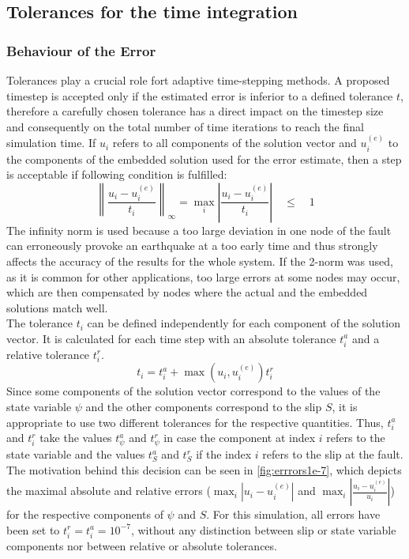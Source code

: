 \subsection{Tolerances for the time integration}
\subsubsection{Behaviour of the Error}
Tolerances play a crucial role fort adaptive time-stepping methods. A proposed timestep is accepted only if the estimated error is inferior to a defined tolerance $t$, therefore a carefully chosen tolerance has a direct impact on the timestep size and consequently on the total number of time iterations to reach the final simulation time. If $u_i$ refers to all components of the solution vector and $u_i^{(e)}$ to the components of the embedded solution used for the error estimate, then a step is acceptable if following condition is fulfilled: 
\begin{equation}
\left\|\frac{u_i - u_i^{(e)}}{t_i}\right\|_\infty = \max_i \left|\frac{u_i - u_i^{(e)}}{t_i}\right|
\quad \leq \quad 1
\end{equation}
The infinity norm is used because a too large deviation in one node of the fault can erroneously provoke an earthquake at a too early time and thus strongly affects the accuracy of the results for the whole system. If the 2-norm was used, as it is common for other applications, too large errors at some nodes may occur, which are then compensated by nodes where the actual and the embedded solutions match well. \\
The tolerance $t_i$ can be defined independently for each component of the solution vector. It is calculated for each time step with an absolute tolerance $t_i^a$ and a relative tolerance $t_i^r$. 
\begin{equation}
t_i = t_i^a + \max\left(u_i,u_i^{(e)}\right)t_i^r
\end{equation}
Since some components of the solution vector correspond to the values of the state variable $\psi$ and the other components correspond to the slip $S$, it is appropriate to use two different tolerances for the respective quantities. Thus, $t_i^a$ and $t_i^r$ take the values $t_\psi^a$ and $t_\psi^r$ in case the component at index $i$ refers to the state variable and the values $t_S^a$ and $t_S^r$ if the index $i$ refers to the slip at the fault. The motivation behind this decision can be seen in \autoref{fig:errrors1e-7}, which depicts the maximal absolute and relative errors ($\max_i\left|u_i-u_i^{(e)}\right|$ and $\max_i\left|\frac{u_i-u_i^{(e)}}{u_i}\right|$) for the respective components of $\psi$ and $S$. For this simulation, all errors have been set to $t_i^r = t_i^a = 10^{-7}$, without any distinction between slip or state variable components nor between relative or absolute tolerances.
